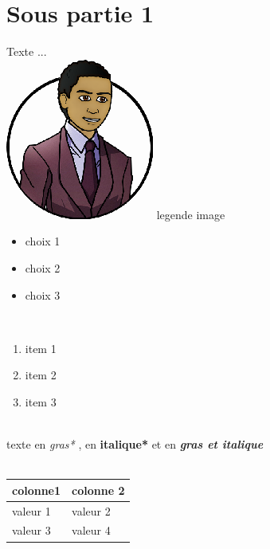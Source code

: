 \documentclass[11pt,fleqn]{book}
\begin{document}
\section{Sous partie 1}
Texte  ...
~\\
\includegraphics{./57cb4d9807154.png}
legende image
~\\
\begin{itemize}
\item choix  1
\item choix  2
\item choix  3
\end{itemize}
~\\
\begin{enumerate}
\item item  1
\item item  2
\item item  3 
\end{enumerate}
~\\
texte  en  \textit{gras*} ,  en  \textbf{italique*} et  en  \textbf{\textit{gras et italique}}
~\\
~\\
\begin{tabular}
{|l|l|}
\hline
colonne1 & colonne 2\\
\hline
valeur  1 & valeur  2\\
valeur  3 & valeur  4\\
\hline
\end{tabular}
~\\
~\\
\end{document}
